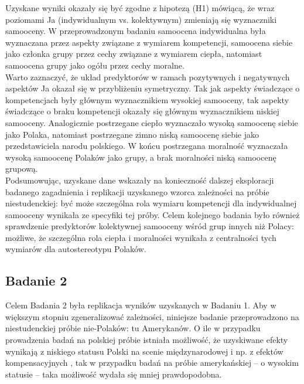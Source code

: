 \documentclass[man]{apa6}
\begin{document}
Uzyskane wyniki okazały się być zgodne z hipotezą (H1) mówiącą, że wraz poziomami Ja (indywidualnym vs. kolektywnym) zmieniają się wyznaczniki samooceny. W przeprowadzonym badaniu samoocena indywidualna była wyznaczana przez aspekty związane z wymiarem kompetencji, samoocena siebie jako członka grupy przez cechy związane z wymiarem ciepła, natomiast samoocena grupy jako ogółu przez cechy moralne. \\

Warto zaznaczyć, że układ predyktorów w ramach pozytywnych i negatywnych aspektów Ja okazał się w przybliżeniu symetryczny. Tak jak aspekty świadczące o kompetencjach były głównym wyznacznikiem wysokiej samooceny, tak aspekty świadczące o braku kompetencji okazały się głównym wyznacznikiem niskiej samooceny. Analogicznie postrzegane ciepło wyznaczało wysoką samoocenę siebie jako Polaka, natomiast postrzegane zimno niską samoocenę siebie jako przedstawiciela narodu polskiego. W końcu postrzegana moralność wyznaczała wysoką samoocenę Polaków jako grupy, a brak moralności niską samoocenę grupową. \\

Podsumowując, uzyskane dane wskazały na konieczność dalszej eksploracji badanego zagadnienia i replikacji uzyskanego wzorca zależności na próbie niestudenckiej: być może szczególna rola wymiaru kompetencji dla indywidualnej samooceny wynikała ze specyfiki tej próby. Celem kolejnego badania było również sprawdzenie predyktorów kolektywnej samooceny wśród grup innych niż Polacy: możliwe, że szczególna rola ciepła i moralności wynikała z centralności tych wymiarów dla autostereotypu Polaków. \\

\newpage
\subsection{Badanie 2}
Celem Badania 2 była replikacja wyników uzyskanych w Badaniu 1. Aby w większym stopniu zgeneralizować zależności, niniejsze badanie przeprowadzono na niestudenckiej próbie nie-Polaków: tu Amerykanów. O ile w przypadku prowadzenia badań na polskiej próbie istniała możliwość, że uzyskiwane efekty wynikają z niskiego statusu Polski na scenie międzynarodowej i np. z efektów kompensacyjnych \parencite[zob. np.][]{judd2005fundamental, oldmeadow2010social}, tak w przypadku badań na próbie amerykańskiej -- o wysokim statusie -- taka możliwość wydała się mniej prawdopodobna.\\
\end{document}
